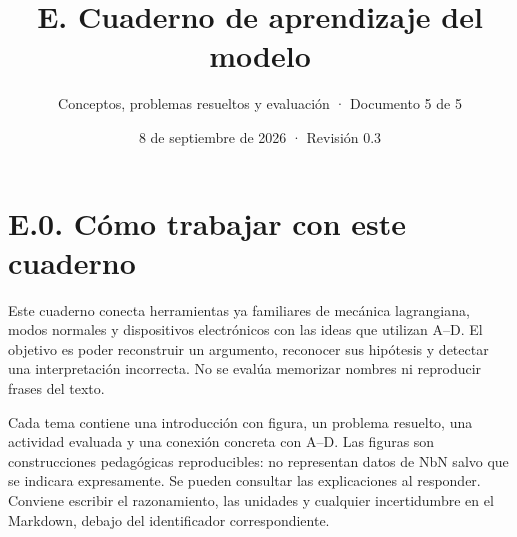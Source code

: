 \documentclass[
  spanish,
  10pt,
  a4paper,
]{article}
\title{E. Cuaderno de aprendizaje del modelo}
\subtitle{Conceptos, problemas resueltos y evaluación · Documento 5 de
5}
\author{}
\date{8 de septiembre de 2026 · Revisión 0.3}
\begin{document}
\maketitle

{
\setcounter{tocdepth}{2}
\tableofcontents
}
\newpage

\setlength{\parskip}{3.5pt plus 1pt}

\section{E.0. Cómo trabajar con este
cuaderno}\label{e.0.-cuxf3mo-trabajar-con-este-cuaderno}

Este cuaderno conecta herramientas ya familiares de mecánica
lagrangiana, modos normales y dispositivos electrónicos con las ideas
que utilizan A--D. El objetivo es poder reconstruir un argumento,
reconocer sus hipótesis y detectar una interpretación incorrecta. No se
evalúa memorizar nombres ni reproducir frases del texto.

Cada tema contiene una introducción con figura, un problema resuelto,
una actividad evaluada y una conexión concreta con A--D. Las figuras son
construcciones pedagógicas reproducibles: no representan datos de NbN
salvo que se indicara expresamente. Se pueden consultar las
explicaciones al responder. Conviene escribir el razonamiento, las
unidades y cualquier incertidumbre en el Markdown, debajo del
identificador correspondiente.
\end{document}

